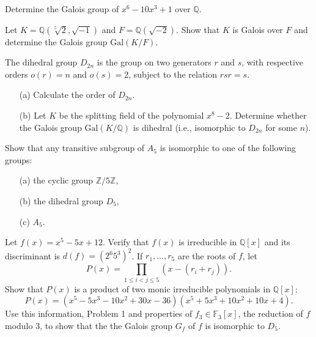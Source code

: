 \begin{prob}[S2016-Q3]
    Determine the Galois group of \(x^{6}-10x^{3}+1\) over \(\mathbb{Q}\).
\end{prob}

\begin{prob}[F2010-Q3]
    Let \(K = \mathbb{Q}(\sqrt[5]{2}, \sqrt{-1})\) and \(F = \mathbb{Q}(\sqrt{-2})\). Show that \(K\) is Galois over \(F\) and determine the Galois group \(\text{Gal}(K/F)\).
\end{prob}


\begin{prob}[F2015-Q2]
    The dihedral group \(D_{2n}\) is the group on two generators \(r\) and \(s\), with respective orders \(o(r)=n\) and \(o(s)=2\), subject to the relation \(rsr=s\).
    \begin{itemize}
        \item[(a)] Calculate the order of \(D_{2n}\).
        \item[(b)] Let \(K\) be the splitting field of the polynomial \(x^8 - 2\). Determine whether the Galois group \(\text{Gal}(K/\mathbb{Q})\) is dihedral (i.e., isomorphic to \(D_{2n}\) for some \(n\)).
    \end{itemize}
\end{prob}


\begin{prob}[S2019-Q1]
    Show that any transitive subgroup of \(A_{5}\) is isomorphic to one of the following groups:
    \begin{itemize}
        \item[(a)] the cyclic group \(\mathbb{Z}/5\mathbb{Z}\),
        \item[(b)] the dihedral group \(D_{5}\),
        \item[(c)] \(A_{5}\).
    \end{itemize}
\end{prob}


\begin{prob}[S2019-Q2]
    Let \(f(x)=x^{5}-5x+12\). Verify that \(f(x)\) is irreducible in \(\mathbb{Q}[x]\) and its discriminant is \(d(f)=(2^{6}5^{3})^{2}\). If \(r_{1},\ldots,r_{5}\) are the roots of \(f\), let
    \[P(x)=\prod_{1\leq i<j\leq 5}(x-(r_{i}+r_{j})).\]
    Show that \(P(x)\) is a product of two monic irreducible polynomials in \(\mathbb{Q}[x]\):
    \[P(x)=(x^{5}-5x^{3}-10x^{2}+30x-36)(x^{5}+5x^{3}+10x^{2}+10x+4).\]
    Use this information, Problem 1 and properties of \(f_{3}\in\mathbb{F}_{3}[x]\), the reduction of \(f\) modulo 3, to show that the the Galois group \(G_{f}\) of \(f\) is isomorphic to \(D_{5}\).
\end{prob}


